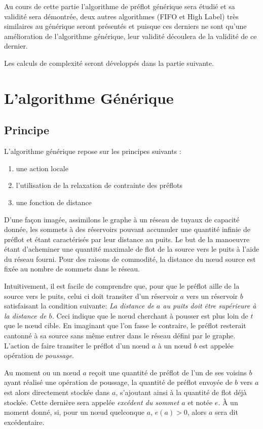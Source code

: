 Au cours de cette partie l'algorithme de préflot générique sera étudié et sa validité sera
démontrée, deux autres algorithmes (FIFO et High Label) très similaires au générique seront
présentés et puisque ces derniers ne sont qu'une amélioration de l'algorithme générique, leur
validité découlera de la validité de ce dernier.

Les calculs de complexité seront développés dans la partie suivante.

\section{L'algorithme Générique}

\subsection{Principe}

L'algorithme générique repose sur les principes suivants :
\begin{enumerate}
	\item une action locale
	\item l'utilisation de la relaxation de contrainte des préflots
	\item une fonction de distance
\end{enumerate}

D'une façon imagée, assimilons le graphe à un réseau de tuyaux de capacité donnée, les sommets à des
réservoirs pouvant accumuler une quantité infinie de préflot et étant caractérisés par leur distance au
puits. Le but de la manoeuvre étant d'acheminer une quantité maximale de flot de la source vers le
puits à l'aide du réseau fourni. Pour des raisons de commodité, la distance du n\oe ud source est fixée
au nombre de sommets dans le réseau. 

Intuitivement, il est facile de comprendre que, pour que le préflot aille de la source vers le puits,
celui ci doit transiter d'un réservoir $a$ vers un réservoir $b$ satisfaisant la condition suivante:
\emph{La distance de $a$ au puits doit être supérieure à la distance de $b$.} Ceci indique que le
n\oe ud cherchant à pousser est plus loin de $t$ que le n\oe ud cible.  En imaginant que l'on
fasse le contraire, le préflot resterait cantonné à sa source sans même entrer dans le réseau défini
par le graphe. L'action de faire transiter le préflot d'un n\oe ud $a$ à un n\oe ud $b$ est appelée
opération de \emph{poussage}.

Au moment ou un n\oe ud $a$ reçoit une quantité de préflot de l'un de ses voisins $b$ ayant réalisé une
opération de poussage, la quantité de préflot envoyée de $b$ vers $a$ est alors directement stockée
dans $a$, s'ajoutant ainsi à la quantité de flot déjà stockée. Cette dernière sera appelée
\emph{excédent du sommet $a$} et notée $e$. À un moment donné, si, pour un n\oe ud quelconque $a$,
$e(a) > 0$, alors $a$ sera dit excédentaire.

